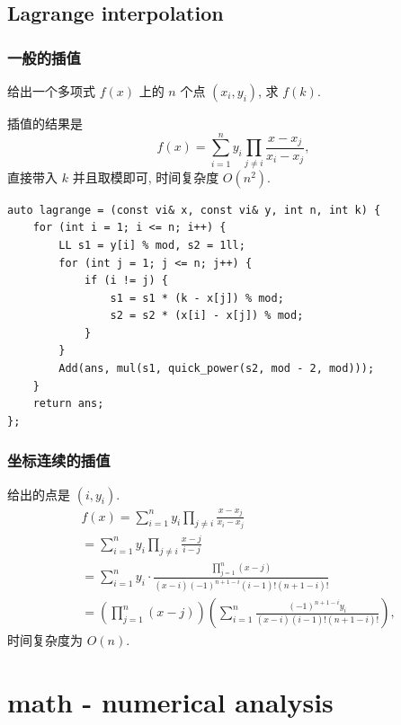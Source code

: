 \documentclass[UTF8, a4paper, titlepage, twoside]{ctexart}
\begin{document}
\subsection*{ Lagrange interpolation }

\subsubsection*{ 一般的插值 }

给出一个多项式 \(f(x)\) 上的 \(n\) 个点 \((x_i, y_i)\), 求 \(f(k)\).

插值的结果是
\[
f(x) = \sum_{i=1}^{n} y_i \prod_{j \neq i} \frac{x - x_j}{x_i - x_j},
\]
直接带入 \(k\) 并且取模即可, 时间复杂度 $O(n^2)$.

\begin{lstlisting}[style=cpp]
auto lagrange = (const vi& x, const vi& y, int n, int k) {
    for (int i = 1; i <= n; i++) {
        LL s1 = y[i] % mod, s2 = 1ll;
        for (int j = 1; j <= n; j++) {
            if (i != j) {
                s1 = s1 * (k - x[j]) % mod;
                s2 = s2 * (x[i] - x[j]) % mod;
            }
        }
        Add(ans, mul(s1, quick_power(s2, mod - 2, mod)));
    }
    return ans;
};
\end{lstlisting}

\subsubsection*{ 坐标连续的插值 }

给出的点是 $(i, y_i)$.
\[
\begin{aligned}
& f(x) = \sum_{i=1}^{n} y_i \prod_{j \neq i} \frac{x - x_j}{x_i - x_j} \\
& = \sum_{i=1}^{n} y_i \prod_{j \neq i} \frac{x - j}{i - j} \\
& = \sum_{i=1}^{n} y_i \cdot \frac{\prod\limits_{j=1}^n (x - j)}{(x - i) (-1)^{n+1-i}(i-1)!(n+1-i)!} \\
& = \left( \prod_{j=1}^n (x - j) \right) \left(\sum_{i=1}^n \frac{(-1)^{n+1-i}y_i}{(x-i)(i-1)!(n+1-i)!}\right),
\end{aligned}
\]
时间复杂度为 \(O(n)\).

\newpage
\section{ math - numerical analysis }
\end{document}
